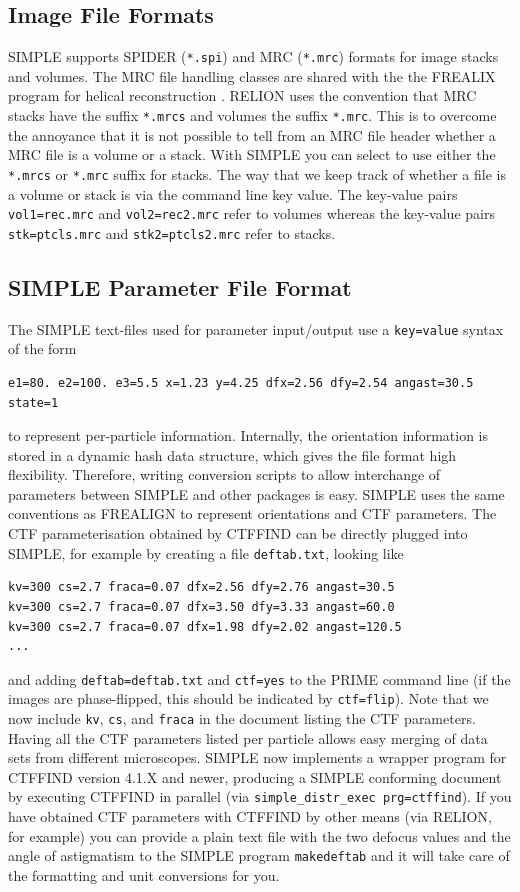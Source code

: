 \documentclass[a4paper,11pt]{article}
\newcommand{\prgname}[1]{\textcolor{NavyBlue}{\texttt{#1}}}
\begin{document}
\subsection{Image File Formats}
SIMPLE supports SPIDER (\texttt{*.spi}) and MRC (\texttt{*.mrc}) formats for image stacks and volumes. The MRC file handling classes are shared with the the FREALIX program for helical reconstruction \citep{Rohou:2014aa}. RELION \citep{Scheres:2012aa} uses the convention that MRC stacks have the suffix \texttt{*.mrcs} and volumes the suffix \texttt{*.mrc}. This is to overcome the annoyance that it is not possible to tell from an MRC file header whether a MRC file is a volume or a stack. With SIMPLE you can select to use either the \texttt{*.mrcs} or \texttt{*.mrc} suffix for stacks. The way that we keep track of whether a file is a volume or stack is via the command line key value. The key-value pairs \texttt{vol1=rec.mrc} and \texttt{vol2=rec2.mrc} refer to volumes whereas the key-value pairs \texttt{stk=ptcls.mrc} and \texttt{stk2=ptcls2.mrc} refer to stacks. 


\subsection{SIMPLE Parameter File Format}
The SIMPLE text-files used for parameter input/output use a \texttt{key=value} syntax of the form
\begin{verbatim}
e1=80. e2=100. e3=5.5 x=1.23 y=4.25 dfx=2.56 dfy=2.54 angast=30.5 state=1
\end{verbatim}
to represent per-particle information. Internally, the orientation information is stored in a dynamic hash data structure, which gives the file format high flexibility. Therefore, writing conversion scripts to allow interchange of parameters between SIMPLE and other packages is easy. SIMPLE uses the same conventions as FREALIGN \citep{Grigorieff:2007aa} to represent orientations and CTF parameters. The CTF parameterisation obtained by CTFFIND \citep{Mindell:2003aa} can be directly plugged into SIMPLE, for example by creating a file \texttt{deftab.txt}, looking like
\begin{verbatim}
kv=300 cs=2.7 fraca=0.07 dfx=2.56 dfy=2.76 angast=30.5
kv=300 cs=2.7 fraca=0.07 dfx=3.50 dfy=3.33 angast=60.0
kv=300 cs=2.7 fraca=0.07 dfx=1.98 dfy=2.02 angast=120.5
...
\end{verbatim}
and adding \texttt{deftab=deftab.txt} and \texttt{ctf=yes} to the PRIME command line (if the images are phase-flipped, this should be indicated by \texttt{ctf=flip}). Note that we now include \texttt{kv}, \texttt{cs}, and \texttt{fraca} in the document listing the CTF parameters. Having all the CTF parameters listed per particle allows easy merging of data sets from different microscopes. SIMPLE now implements a wrapper program for CTFFIND version 4.1.X and newer, producing a SIMPLE conforming document by executing CTFFIND in parallel (via \texttt{simple\_distr\_exec prg=ctffind}). If you have obtained CTF parameters with CTFFIND by other means (via RELION, for example) you can provide a plain text file with the two defocus values and the angle of astigmatism to the SIMPLE program \prgname{makedeftab} and it will take care of the formatting and unit conversions for you.
\end{document}
